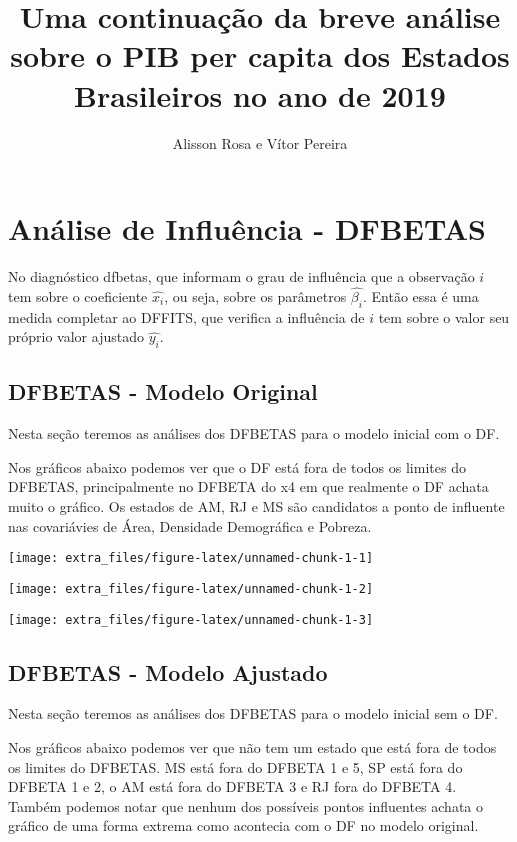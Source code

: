 \documentclass[
]{article}
\title{Uma continuação da breve análise sobre o PIB per capita dos Estados Brasileiros no ano de 2019}
\author{Alisson Rosa e Vítor Pereira}
\date{}
\begin{document}
\maketitle

{
\setcounter{tocdepth}{2}
\tableofcontents
}
\section{Análise de Influência - DFBETAS}

No diagnóstico dfbetas, que informam o grau de influência que a observação \(i\) tem sobre o coeficiente \(\hat{x_i}\), ou seja, sobre os parâmetros \(\hat{\beta_i}\). Então essa é uma medida completar ao DFFITS, que verifica a influência de \(i\) tem sobre o valor seu próprio valor ajustado \(\hat{y_i}\).

\subsection{DFBETAS - Modelo Original}

Nesta seção teremos as análises dos DFBETAS para o modelo inicial com o DF.

Nos gráficos abaixo podemos ver que o DF está fora de todos os limites do DFBETAS, principalmente no DFBETA do x4 em que realmente o DF achata muito o gráfico. Os estados de AM, RJ e MS são candidatos a ponto de influente nas covariávies de Área, Densidade Demográfica e Pobreza.

\begin{center}\texttt{[image: extra\_files/figure-latex/unnamed-chunk-1-1]} \end{center}

\begin{center}\texttt{[image: extra\_files/figure-latex/unnamed-chunk-1-2]} \end{center}

\begin{center}\texttt{[image: extra\_files/figure-latex/unnamed-chunk-1-3]} \end{center}

\subsection{DFBETAS - Modelo Ajustado}

Nesta seção teremos as análises dos DFBETAS para o modelo inicial sem o DF.

Nos gráficos abaixo podemos ver que não tem um estado que está fora de todos os limites do DFBETAS. MS está fora do DFBETA 1 e 5, SP está fora do DFBETA 1 e 2, o AM está fora do DFBETA 3 e RJ fora do DFBETA 4. Também podemos notar que nenhum dos possíveis pontos influentes achata o gráfico de uma forma extrema como acontecia com o DF no modelo original.
\end{document}
